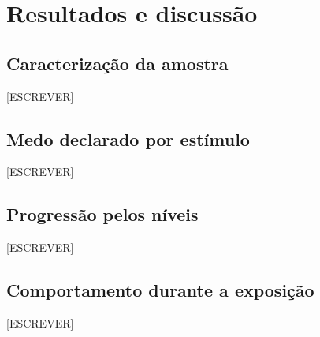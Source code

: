 \section{Resultados e discussão}

%

\subsection{Caracterização da amostra}

% 
[ESCREVER]

\subsection{Medo declarado por estímulo}

[ESCREVER]

\subsection{Progressão pelos níveis}

[ESCREVER]

\subsection{Comportamento durante a exposição}

[ESCREVER]

